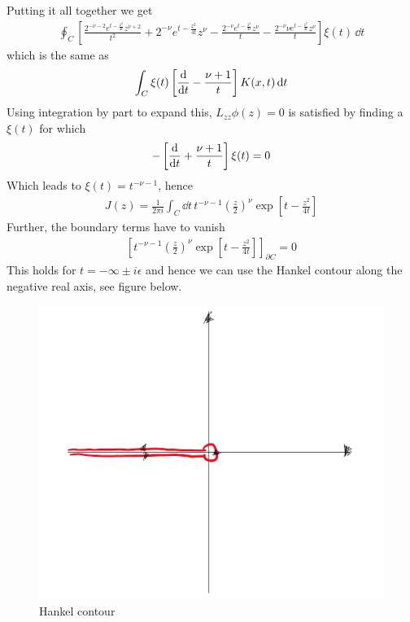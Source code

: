 \documentclass[a4paper,12pt]{article}
\begin{document}
Putting it all together we get 
\begin{equation}
	\begin{aligned}
		\oint_C  \left[\frac{2^{-\nu -2} e^{t-\frac{z^2}{4 t}} z^{\nu +2}}{t^2}+2^{-\nu } e^{t-\frac{z^2}{4 t}} z^{\nu }-\frac{2^{-\nu } e^{t-\frac{z^2}{4 t}} z^{\nu }}{t}-\frac{2^{-\nu } \nu  e^{t-\frac{z^2}{4 t}} z^{\nu }}{t}\right]\xi(t)\,\dd t
	\end{aligned}
\end{equation}
which is the same as 
\begin{equation}
	\begin{aligned}
			\int_C  \xi(t)\left[\dv{}{t}-\frac{\nu+1}{t}\right]K(x,t)\,\dd t	
	\end{aligned}
\end{equation}
Using integration by part to expand this, $L_{zz}\phi(z)=0$ is satisfied by finding a $\xi(t)$ for which 
\begin{equation}
	\begin{aligned}
		-\left[\dv{}{t}+\frac{\nu+1}{t}\right]\xi(t)=0
	\end{aligned}
\end{equation} 
Which leads to $\xi(t)=t^{-\nu-1}$, hence
\begin{equation}
	\begin{aligned}
		J(z)=\frac{1}{2\pi i}\int_C\dd t\, t^{-\nu-1}\left(\frac{z}{2}\right)^\nu\exp[t-\frac{z^2}{4t}]
	\end{aligned}
\end{equation}
Further, the boundary terms have to vanish 
\begin{equation}
	\begin{aligned}
		\left[t^{-\nu-1}\left(\frac{z}{2}\right)^\nu\exp[t-\frac{z^2}{4t}]\right]_{\partial C}=0
	\end{aligned}
\end{equation}
This holds for  $t=-\infty \pm i\epsilon$ and hence we can use the Hankel contour along the negative real axis, see figure below.
\begin{figure}[H]
	\centering
	\includegraphics[width=0.45\linewidth]{27}
	\caption{Hankel contour}
	\label{fig:rectangle}
\end{figure}
\end{document}
